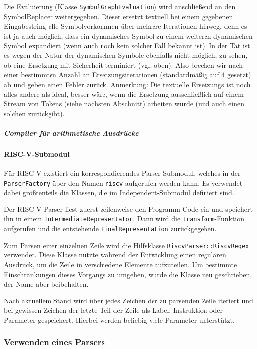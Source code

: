 Die Evaluierung (Klasse \texttt{SymbolGraphEvaluation}) wird anschließend an den SymbolReplacer weitergegeben. Dieser ersetzt textuell bei einem gegebenen Eingabestring alle Symbolvorkommen über mehrere Iterationen hinweg, denn es ist ja auch möglich, dass ein dynamisches Symbol zu einem weiteren dynamischen Symbol expandiert (wenn auch noch kein solcher Fall bekannt ist). In der Tat ist es wegen der Natur der dynamischen Symbole ebenfalls nicht möglich, zu sehen, ob eine Ersetzung mit Sicherheit terminiert (vgl. oben). Also brechen wir nach einer bestimmten Anzahl an Ersetzungsiterationen (standardmäßig auf 4 gesetzt) ab und geben einen Fehler zurück. Anmerkung: Die textuelle Ersetzungs ist noch alles andere als ideal, besser wäre, wenn die Ersetzung ausschließlich auf einem Stream von Tokens (siehe nächsten Abschnitt) arbeiten würde (und auch einen solchen zurückgibt).

\subparagraph{Compiler für arithmetische Ausdrücke}

\paragraph{RISC-V-Submodul}

Für RISC-V existiert ein korrespondierendes Parser-Submodul, welches in der
\texttt{ParserFactory} über den Namen \texttt{riscv} aufgerufen werden kann. Es
verwendet dabei größtenteils die Klassen, die im Independent-Submodul definiert
sind.

Der RISC-V-Parser liest zuerst zeilenweise den Programm-Code ein und speichert
ihn in einem \texttt{Intermediate\-Representator}. Dann wird die
\texttt{transform}-Funktion aufgerufen und die entstehende
\texttt{Final\-Representation} zurückgegeben.

Zum Parsen einer einzelnen Zeile wird die Hilfsklasse
\texttt{RiscvParser::\allowbreak{}RiscvRegex} verwendet. Diese Klasse nutzte
während der Entwicklung einen regulären Ausdruck, um die Zeile in
verschiedene Elemente aufzuteilen. Um bestimmte Einschränkungen dieses Vorgangs
zu umgehen, wurde die Klasse neu geschrieben, der Name aber beibehalten.

Nach aktuellem Stand wird über jedes Zeichen der zu parsenden Zeile iteriert und
bei gewissen Zeichen der letzte Teil der Zeile als Label, Instruktion oder
Parameter gespeichert. Hierbei werden beliebig viele Parameter unterstützt.

\subsubsection{Verwenden eines Parsers}


